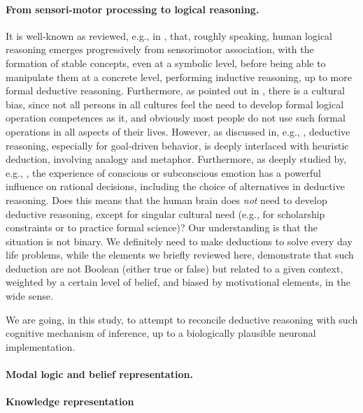 \documentclass[a4]{article}
\begin{document}
\paragraph{From sensori-motor processing to logical reasoning.}

It is well-known as reviewed, e.g., in \cite{ness_knowledge_2007}, that, roughly speaking, human logical reasoning emerges progressively from sensorimotor association, with the formation of stable concepts, even at a symbolic level, before being able to manipulate them at a concrete level, performing inductive reasoning, up to more formal deductive reasoning. Furthermore, as pointed out in \cite{arnett_adolescence_2001}, there is a cultural bias, since not all persons in all cultures feel the need to develop formal logical operation competences as it, and obviously most people do not use such formal operations in all aspects of their lives. However, as discussed in, e.g., \cite{keefer_metaphor_2016}, deductive reasoning, especially for goal-driven behavior, is deeply interlaced with heuristic deduction, involving analogy and metaphor. Furthermore, as deeply studied by, e.g., \cite{purves_interplay_2001}, the experience of conscious or subconscious emotion has a powerful influence on rational decisions, including the choice of alternatives in deductive reasoning. Does this means that the human brain does {\em not} need to develop deductive reasoning, except for singular cultural need (e.g., for scholarship constraints or to practice formal science)? Our understanding is that the situation is not binary. We definitely need to make deductions to solve every day life problems, while the elements we briefly reviewed here, demonstrate that such deduction are not Boolean (either true or false) but related to a given context, weighted by a certain level of belief, and biased by motivational elements, in the wide sense.

We are going, in this study, to attempt to reconcile deductive reasoning with such cognitive mechanism of inference, up to a biologically plausible neuronal implementation.

\paragraph{Modal logic and belief representation.}

\paragraph{Knowledge representation}
\end{document}
